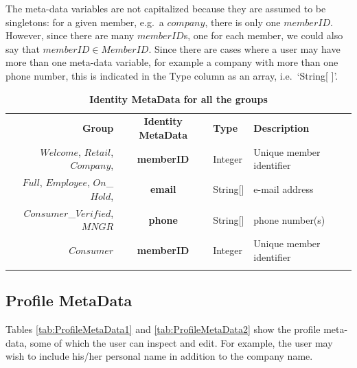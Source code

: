 The meta-data variables are not capitalized because they are assumed to be singletons: for a given member, e.g.\ a $company$, there is only one $memberID$. However, since there are many $memberID$s, one for each member, we could also say that $memberID \in MemberID$. Since there are cases where a user may have more than one meta-data variable, for example a company with more than one phone number, this is indicated in the Type column as an array, i.e.\ `String[ ]'.

\begin{table}[H]
\vspace{-0.5cm}
\begin{centering}
\small
{
\begin{tabular}{ r | c | l | l }
\hline
\textbf{Group}	& {\bf Identity MetaData} & {\bf Type} & {\bf Description} \\
\Xhline{1.5pt}
$Welcome$, $Retail$, $Company$,	& {\bf memberID}			&Integer	& Unique member identifier \\
$Full$, $Employee$, $On$\_$Hold$,	& {\bf email}				&String[]	& e-mail address \\		
$Consumer$\_$Verified$, $MNGR$	& {\bf phone}				&String[]	& phone number(s) \\
\hline
$Consumer$	& {\bf memberID}	&Integer & Unique member identifier \\
\Xhline{1.5pt}
\end{tabular}
}
\caption{\small\textbf{Identity MetaData for all the groups}}
\label{tab:IdentityMetaData}
\end{centering}
\vspace{-1cm}
\end{table}

\subsection{Profile MetaData}
Tables \ref{tab:ProfileMetaData1} and \ref{tab:ProfileMetaData2} show the profile meta-data, some of which the user can inspect and edit. For example, the user may wish to include his/her personal name in addition to the company name.

